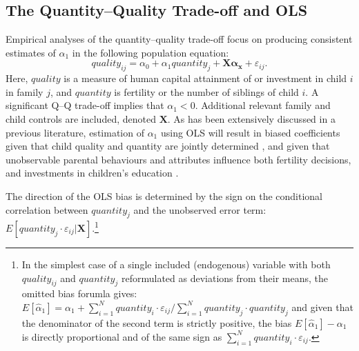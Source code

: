 \documentclass[subeqn]{article}
\begin{document}
\begin{spacing}{1.4}
\subsection{The Quantity--Quality Trade-off and OLS}
\label{sscn:OLS}
Empirical analyses of the quantity--quality trade-off focus on producing
consistent estimates of $\alpha_1$ in the following population equation:
\begin{equation}
  \label{TWINeqn:RF}
  quality_{ij}=\alpha_0+\alpha_1 quantity_{j} + \bm{X}\bm{\alpha_x}+\varepsilon_{ij}.
\end{equation}
Here, $quality$ is a measure of human capital attainment of or investment in child
$i$ in family $j$, and $quantity$ is fertility or the number of siblings of child 
$i$. %
A significant Q--Q trade-off implies that $\alpha_1<0$. Additional relevant family and child controls are included, denoted $\bm{X}$.
As has been extensively discussed in a previous literature, estimation of $\alpha_1$
using OLS %
will result in biased coefficients given that
child quality and quantity are jointly determined \citep{BeckerLewis1973,
  BeckerTomes1976}, and given that unobservable parental behaviours and attributes
influence both fertility decisions, and investments in children's education
\citep{Qian2009}. %

The direction of the OLS bias is determined by the sign on the conditional correlation
between $quantity_j$ and the unobserved error term:
$E[quantity_{j}\cdot\varepsilon_{ij}|\bm{X}]$.\footnote{In the simplest case
  of a single included (endogenous) variable with both $quality_{ij}$ and
  $quantity_j$ reformulated as deviations from their means, the omitted bias
  forumla gives:
  $
  E[\hat\alpha_1]=\alpha_1+\sum_{i=1}^N quantity_i\cdot\varepsilon_{ij}/\sum_{i=1}^N quantity_j\cdot quantity_j
  $
  and given that the denominator of the second term is strictly positive, the
  bias $E[\hat\alpha_1]-\alpha_1$ is directly proportional and of the same
  sign as $\sum_{i=1}^N quantity_i\cdot\varepsilon_{ij}$.
}


\end{spacing}
\end{document}
